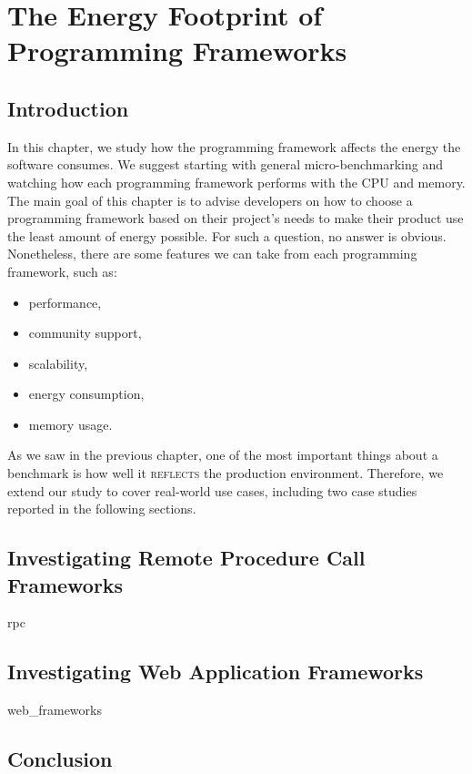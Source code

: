 \chapter{The Energy Footprint of Programming Frameworks}
\label{chapter:porgramming_langauges}
\section{Introduction}
In this chapter, we study how the programming framework affects the energy the software consumes.
We suggest starting with general micro-benchmarking and watching how each programming framework performs with the CPU and memory.
The main goal of this chapter is to advise developers on how to choose a programming framework based on their project's needs to make their product use the least amount of energy possible.
For such a question, no answer is obvious.
Nonetheless, there are some features we can take from each programming framework, such as:
\begin{itemize}
    \item performance,
    \item community support,
    \item scalability,
    \item energy consumption,
    \item memory usage.
\end{itemize}

As we saw in the previous chapter, one of the most important things about a benchmark is how well it \textsc{reflects} the production environment.
Therefore, we extend our study to cover real-world use cases, including two case studies reported in the following sections.

\section{Investigating Remote Procedure Call Frameworks}
{rpc}

\section{Investigating Web Application Frameworks}
{web_frameworks}

\section{Conclusion}
